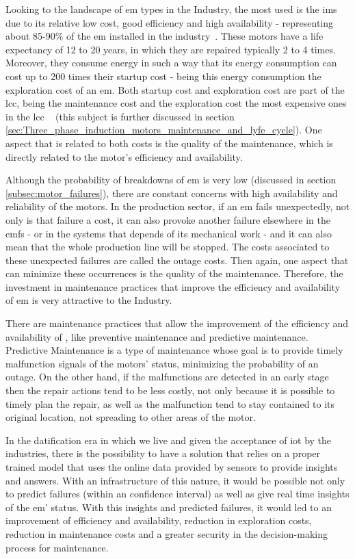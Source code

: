Looking to the landscape of \acrlong{em} types in the Industry, the most used is the \acrfull{ims} due to its relative low cost, good efficiency and high availability - representing about 85-90\% of the \acrlong{em} installed in the industry~\cite{Ferreira1}. 
These motors have a life expectancy of 12 to 20 years, in which they are repaired typically 2 to 4 times. Moreover, they consume energy in such a way that its energy consumption can cost up to 200 times their startup cost - being this energy consumption the exploration cost of an \acrlong{em}.
Both startup cost and exploration cost are part of the \acrfull{lcc}, being the maintenance cost and the exploration cost the most expensive ones in the \acrshort{lcc} ~\cite{Ferreira1} (this subject is further discussed in section \ref{sec:Three_phase_induction_motors_maintenance_and_lyfe_cycle}). One aspect that is related to both costs is the quality of the maintenance, which is directly related to the motor's efficiency and availability. 

Although the probability of breakdowns of \acrlong{em} is very low (discussed in section \ref{subsec:motor_failures}), there are constant concerns with high availability and reliability of the motors.
In the production sector, if an \acrlong{em} fails unexpectedly, not only is that failure a cost, it can also provoke another failure elsewhere in the  \acrshort{emfs} - or in the systems that depends of its mechanical work - and it can also mean that the whole production line will be stopped. The costs associated to these unexpected failures are called the outage costs. Then again, one aspect that can minimize these occurrences is the quality of the maintenance. Therefore, the investment in maintenance practices that improve the efficiency and availability of \acrlong{em} is very attractive to the Industry.

There are maintenance practices that allow the improvement of the efficiency and availability of , like preventive maintenance and predictive maintenance. 
Predictive Maintenance is a type of maintenance whose goal is to provide timely malfunction signals of the motors' status, minimizing the probability of an outage.  
On the other hand, if the malfunctions are detected in an early stage then the repair actions tend to be less costly, not only because it is possible to timely plan the repair, as well as the malfunction tend to stay contained to its original location, not spreading to other areas of the motor.


In the datification era in which we live and given the acceptance of \acrfull{iot} by the industries, there is the possibility to have a solution that relies on a proper trained model that uses the online data provided by sensors to provide insights and answers. 
With an infrastructure of this nature, it would be possible not only to predict failures (within an confidence interval) as well as give real time insights of the \acrlong{em}' status. With this insights and predicted failures, it would led to an improvement of efficiency and availability, reduction in exploration costs, reduction in maintenance costs and a greater security in the decision-making process for maintenance.

